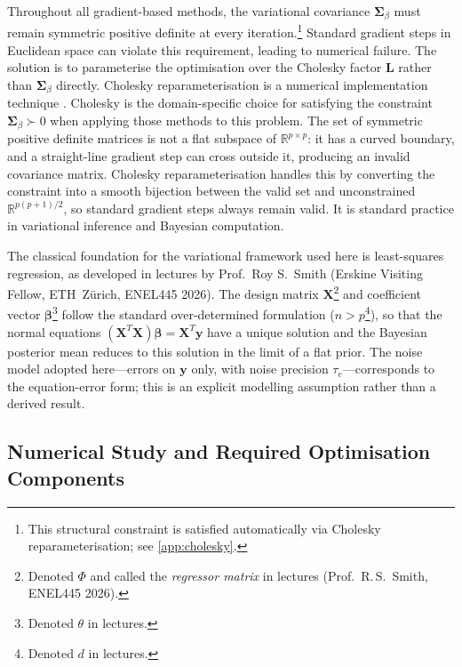 \documentclass[11pt,a4paper]{article}
\newcommand{\R}{\mathbb{R}}
\begin{document}
Throughout all gradient-based methods, the variational covariance $\bm{\Sigma}_\beta$ must remain symmetric positive definite at every iteration.\footnote{This structural constraint is satisfied automatically via Cholesky reparameterisation; see \ref{app:cholesky}. 
} 
Standard gradient steps in Euclidean space can violate this requirement, leading to numerical failure.
 The solution is to parameterise the optimisation over the Cholesky factor $\bm{L}$ rather than $\bm{\Sigma}_\beta$ directly.
 Cholesky reparameterisation is a numerical implementation technique .   Cholesky is the domain-specific choice for satisfying the constraint $\bm{\Sigma}_\beta \succ 0$ when applying those methods to this problem. The set of symmetric positive definite matrices is not a flat subspace of $\R^{p \times p}$: it has a curved boundary, and a straight-line gradient step can cross outside it, producing an invalid covariance matrix. Cholesky reparameterisation handles this by converting the constraint into a smooth bijection between the valid set and unconstrained $\R^{p(p+1)/2}$, so standard gradient steps always remain valid. It is standard practice in variational inference and Bayesian computation.

The classical foundation for the variational framework used here is least-squares regression,
as developed in lectures by Prof.\ Roy S.\ Smith (Erskine Visiting Fellow, ETH~Z\"{u}rich,
ENEL445 2026). The design matrix $\bm{X}$\footnote{Denoted $\Phi$ and called the
\emph{regressor matrix} in lectures (Prof.\ R.\,S.\ Smith, ENEL445 2026).} and coefficient
vector $\bm{\beta}$\footnote{Denoted $\theta$ in lectures.} follow the standard
over-determined formulation ($n > p$\footnote{Denoted $d$ in lectures.}), so that the normal
equations $(\bm{X}^T\bm{X})\bm{\beta} = \bm{X}^T\bm{y}$ have a unique solution and the
Bayesian posterior mean reduces to this solution in the limit of a flat prior. The noise model
adopted here---errors on $\bm{y}$ only, with noise precision $\tau_e$---corresponds to the
equation-error form; this is an explicit modelling assumption rather than a derived result.


 
\subsection{Numerical Study and Required Optimisation Components}
\end{document}
